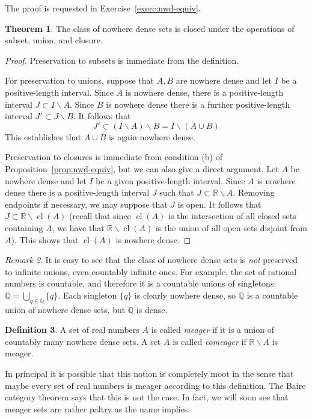 \documentclass[11pt,oneside]{amsart}
\DeclareMathOperator{\cl}{cl}
\newcommand{\QQ}{\mathbb Q}
\newcommand{\RR}{\mathbb R}
\theoremstyle{definition}
\newtheorem{thm}{Theorem}[section]
\theoremstyle{definition}
\newtheorem{defn}[thm]{Definition}
\theoremstyle{remark}
\newtheorem{rem}[thm]{Remark}
\begin{document}
The proof is requested in Exercise~\ref{exerc:nwd-equiv}.

\begin{thm}
  The class of nowhere dense sets is closed under the operations of subset, union, and closure.
\end{thm}

\begin{proof}
  Preservation to subsets is immediate from the definition.

  For preservation to unions, suppose that $A,B$ are nowhere dense and let $I$ be a positive-length interval. Since $A$ is nowhere dense, there is a positive-length interval $J\subset I\smallsetminus A$. Since $B$ is nowhere dense there is a further positive-length interval $J'\subset J\smallsetminus B$. It follows that
\[J'\subset (I\smallsetminus A)\smallsetminus B=I\smallsetminus (A\cup B)
\]
This establishes that $A\cup B$ is again nowhere dense.

Preservation to closures is immediate from condition (b) of Proposition~\ref{prop:nwd-equiv}, but we can also give a direct argument. Let $A$ be nowhere dense and let $I$ be a given positive-length interval. Since $A$ is nowhere dense there is a positive-length interval $J$ such that $J\subset\RR\smallsetminus A$. Removing endpoints if necessary, we may suppose that $J$ is open. It follows that $J\subset\RR\smallsetminus\cl(A)$ (recall that since $\cl(A)$ is the intersection of all closed sets containing $A$, we have that $\RR\smallsetminus\cl(A)$ is the union of all open sets disjoint from $A$). This shows that $\cl(A)$ is nowhere dense.
\end{proof}

\begin{rem}
  It is easy to see that the class of nowhere dense sets is \emph{not} preserved to infinite unions, even countably infinite ones. For example, the set of rational numbers is countable, and therefore it is a countable unions of singletons: $\QQ=\bigcup_{q\in\QQ}\{q\}$. Each singleton $\{q\}$ is clearly nowhere dense, so $\QQ$ is a countable union of nowhere dense sets, but $\QQ$ is dense.
\end{rem}

\begin{defn}
  A set of real numbers $A$ is called \emph{meager} if it is a union of countably many nowhere dense sets. A set $A$ is called \emph{comeager} if $\RR\smallsetminus A$ is meager.
\end{defn}

In principal it is possible that this notion is completely moot in the sense that maybe every set of real numbers is meager according to this definition. The Baire category theorem says that this is not the case. In fact, we will soon see that meager sets are rather paltry as the name implies.
\end{document}

